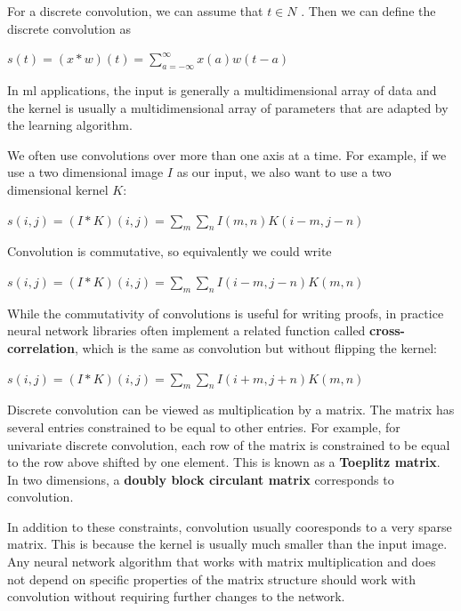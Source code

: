 \documentclass[onecolumn, letterpaper, 12pt]{report}
\begin{document}
For a discrete convolution, we can assume that $t \in N$
. Then we can define the discrete convolution as 


\begin{center}
  $s(t) = (x * w)(t) = \sum\limits_{a = -\infty}^{\infty} x(a)w(t - a)$
\end{center}

In ml applications, the input is generally a multidimensional array of data and the kernel is usually a multidimensional array of parameters that are adapted by the learning algorithm. 

We often use convolutions over more than one axis at a time. For example, if we use a two dimensional image $I$ as our input, we also want to use a two dimensional kernel $K$: 

\begin{center}
  $s(i, j) = (I * K)(i, j) = \sum\limits_m \sum\limits_nI(m,n) K(i-m, j-n)$
\end{center}

Convolution is commutative, so equivalently we could write 

\begin{center}
  $s(i, j) = (I * K)(i, j) = \sum\limits_m \sum\limits_nI(i-m,j-n) K(m, n)$  
\end{center}

While the commutativity of convolutions is useful for writing proofs, in practice neural network libraries often implement a related function called \textbf{cross-correlation}, which is the same as convolution but without flipping the kernel: 

\begin{center}
  $s(i, j) = (I * K)(i, j) = \sum\limits_m \sum\limits_nI(i+m,j+n) K(m, n)$
\end{center}

Discrete convolution can be viewed as multiplication by a matrix. The matrix has several entries constrained to be equal to other entries. For example, for univariate discrete convolution, each row of the matrix is constrained to be equal to the row above shifted by one element. This is known as a \textbf{Toeplitz matrix}. In two dimensions, a \textbf{doubly block circulant matrix} corresponds to convolution. 

In addition to these constraints, convolution usually cooresponds to a very sparse matrix. This is because the kernel is usually much smaller than the input image. Any neural network algorithm that works with matrix multiplication and does not depend on specific properties of the matrix structure should work with convolution without requiring further changes to the network. 
\end{document}
